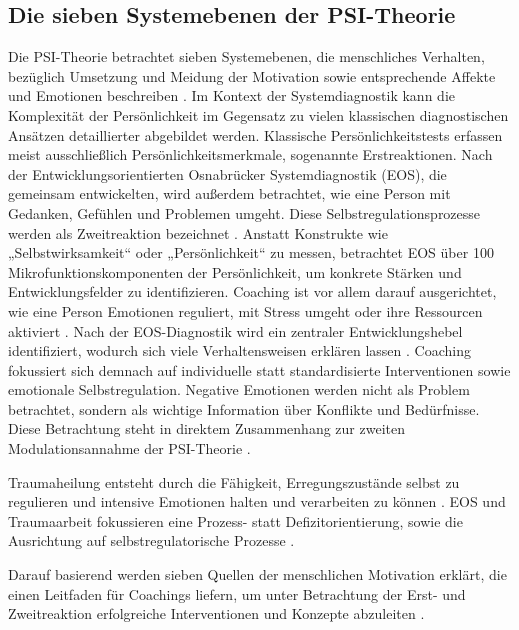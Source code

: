 \subsection{Die sieben Systemebenen der PSI-Theorie}
Die PSI-Theorie betrachtet sieben Systemebenen, die menschliches Verhalten, bezüglich Umsetzung und Meidung der Motivation sowie entsprechende Affekte und Emotionen beschreiben \citep{kuhl2014psi}. Im Kontext der Systemdiagnostik kann die Komplexität der Persönlichkeit im Gegensatz zu vielen klassischen diagnostischen Ansätzen detaillierter abgebildet werden. Klassische Persönlichkeitstests erfassen meist ausschließlich Persönlichkeitsmerkmale, sogenannte Erstreaktionen. Nach der Entwicklungsorientierten Osnabrücker Systemdiagnostik (EOS), die \cite{kuhl2004systemdiagnostik} gemeinsam entwickelten, wird außerdem betrachtet, wie eine Person mit Gedanken, Gefühlen und Problemen umgeht. Diese Selbstregulationsprozesse werden als Zweitreaktion bezeichnet \citep{kuhl2004systemdiagnostik}. Anstatt Konstrukte wie „Selbstwirksamkeit“ oder „Persönlichkeit“ zu messen, betrachtet EOS über 100 Mikrofunktionskomponenten der Persönlichkeit, um konkrete Stärken und Entwicklungsfelder zu identifizieren. Coaching ist vor allem darauf ausgerichtet, wie eine Person Emotionen reguliert, mit Stress umgeht oder ihre Ressourcen aktiviert \citep{kuhl2014psi,Levine2010}. Nach der EOS-Diagnostik wird ein zentraler Entwicklungshebel identifiziert, wodurch sich viele Verhaltensweisen erklären lassen \citep{kuhl2004systemdiagnostik}. Coaching fokussiert sich demnach auf individuelle statt standardisierte Interventionen sowie emotionale Selbstregulation. Negative Emotionen werden nicht als Problem betrachtet, sondern als wichtige Information über Konflikte und Bedürfnisse. Diese Betrachtung steht in direktem Zusammenhang zur zweiten Modulationsannahme der PSI-Theorie \citep{Kuhl2000The}.

Traumaheilung entsteht durch die Fähigkeit, Erregungszustände selbst zu regulieren und intensive Emotionen halten und verarbeiten zu können \citep{Levine2010}. EOS und Traumaarbeit fokussieren eine Prozess- statt Defizitorientierung, sowie die Ausrichtung auf selbstregulatorische Prozesse \citep{kuhl2004systemdiagnostik}.

Darauf basierend werden sieben Quellen der menschlichen Motivation erklärt, die einen Leitfaden für Coachings liefern, um unter Betrachtung der Erst- und Zweitreaktion erfolgreiche Interventionen und Konzepte abzuleiten \citep{kuhl2004systemdiagnostik,kuhl2014psi}. 

